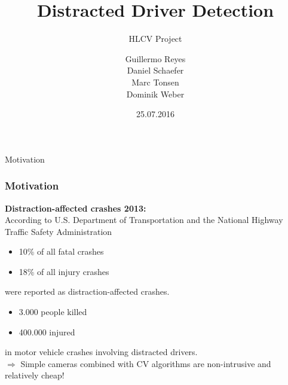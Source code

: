 \documentclass{beamer}
\title{Distracted Driver Detection}
\subtitle{HLCV Project}
\author[Reyes, Schaefer, Tonsen, Weber]{Guillermo Reyes \\
	 Daniel Schaefer \\
	 Marc Tonsen \\
 Dominik Weber\\}
\institute[]{Saarland University}
\date{25.07.2016}
\begin{document}
	\begin{frame}
		\titlepage
	\end{frame}


    \begin{frame}{Motivation}
		\frametitle{Motivation}
        \textbf{Distraction-affected crashes 2013:}\\
        \vspace{0.5cm}
        According to U.S. Department of Transportation and the National Highway Traffic Safety Administration \cite{knuthwebsite}
		\begin{itemize}
            \item 10\% of all fatal crashes
			\item 18\% of all injury crashes
		\end{itemize}
        were reported as distraction-affected crashes.\\
        \begin{itemize}
            \item 3.000 people killed
            \item 400.000 injured
        \end{itemize}
        in motor vehicle crashes involving distracted drivers.\\
		\vspace{0.5cm}
		$\Rightarrow$ Simple cameras combined with CV algorithms are non-intrusive and relatively cheap! 
	\end{frame}
	
\end{document}
